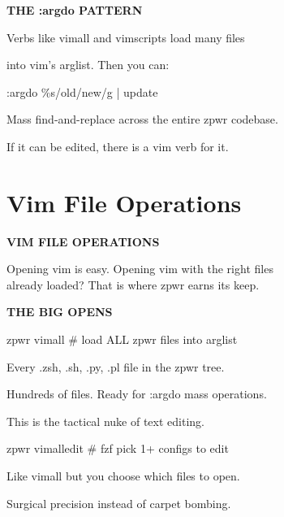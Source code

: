 \documentclass[11pt,a4paper,twoside]{book}
\begin{document}
\vspace{12pt}
{\bfseries\color{neonyellow} THE :argdo PATTERN}\vspace{4pt}

Verbs like vimall and vimscripts load many files

into vim's arglist. Then you can:

:argdo \%s/old/new/g | update

Mass find-and-replace across the entire zpwr codebase.

If it can be edited, there is a vim verb for it.


\vspace{16pt}

\section{Vim File Operations}


\vspace{10pt}
{\large\bfseries\color{neoncyan} VIM FILE OPERATIONS}\vspace{6pt}

\begin{codebox}
Opening vim is easy. Opening vim with the right files\\
already loaded? That is where zpwr earns its keep.\\
\end{codebox}


\vspace{12pt}
{\bfseries\color{neonyellow} THE BIG OPENS}\vspace{4pt}

\begin{codebox}
zpwr vimall             \# load ALL zpwr files into arglist\\
\end{codebox}

Every .zsh, .sh, .py, .pl file in the zpwr tree.

Hundreds of files. Ready for :argdo mass operations.

This is the tactical nuke of text editing.

\begin{codebox}
zpwr vimalledit         \# fzf pick 1+ configs to edit\\
\end{codebox}

Like vimall but you choose which files to open.

Surgical precision instead of carpet bombing.
\end{document}
